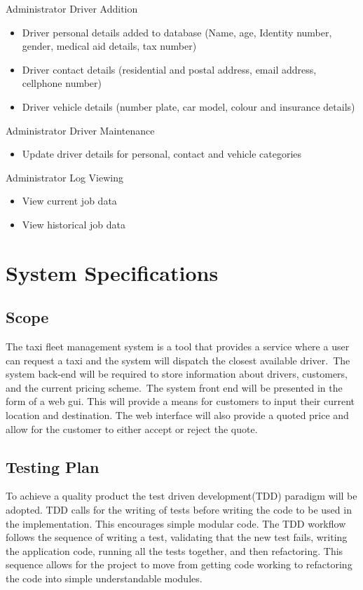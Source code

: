 \documentclass[10pt,twocolumn]{witseiepaper}
\begin{document}
Administrator Driver Addition
\begin{itemize}
\item Driver personal details added to database (Name, age, Identity number, gender, medical aid details, tax number)
\item Driver contact details (residential and postal address, email address, cellphone number)
\item Driver vehicle details (number plate, car model, colour and insurance details)
\end{itemize}
Administrator Driver Maintenance
\begin{itemize}
\item Update driver details for personal, contact and vehicle categories
\end{itemize}
Administrator Log Viewing
\begin{itemize}
\item View current job data
\item View historical job data
\end{itemize}

\section{System Specifications}
\subsection{Scope}

The taxi fleet management system is a tool that provides a service where a user can request a taxi and the system will dispatch the closest available driver.\
The system back-end will be required to store information about drivers, customers, and the current pricing scheme.\
The system front end will be presented in the form of a web gui. This will provide a means for customers to input their current location and destination. The web interface will also provide a quoted price and allow for the customer to either accept or reject the quote.

\subsection{Testing Plan}

To achieve a quality product the test driven development(TDD) paradigm will be adopted. TDD calls for the writing of tests before writing the code to be used in the implementation. This encourages simple modular code. The TDD workflow follows the sequence of writing a test, validating that the new test fails, writing the application code, running all the tests together, and then refactoring. This sequence allows for the project to move from getting code working to refactoring the code into simple understandable modules.
\end{document}

